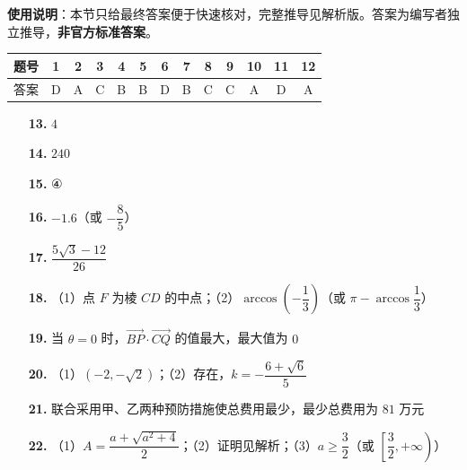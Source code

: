 
\begin{gknotice}
\textbf{使用说明}：本节只给最终答案便于快速核对，完整推导见解析版。答案为编写者独立推导，\textbf{非官方标准答案}。
\end{gknotice}

\begin{center}\begin{tabular}{ccccccccccccc}
\toprule
题号 & 1 & 2 & 3 & 4 & 5 & 6 & 7 & 8 & 9 & 10 & 11 & 12 \\
\midrule
答案 & D & A & C & B & B & D & B & C & C & A & D & A \\
\bottomrule
\end{tabular}\end{center}

\begin{itemize}[leftmargin=2.6em]
  \item[\textbf{13.}] $4$
  \item[\textbf{14.}] $240$
  \item[\textbf{15.}] ④
  \item[\textbf{16.}] $-1.6$（或 $-\dfrac{8}{5}$）
\end{itemize}

\begin{itemize}[leftmargin=2.6em]
  \item[\textbf{17.}] $\dfrac{5\sqrt{3} - 12}{26}$
  \item[\textbf{18.}] （1）点 $F$ 为棱 $CD$ 的中点；（2）$\arccos\left(-\dfrac{1}{3}\right)$（或 $\pi - \arccos\dfrac{1}{3}$）
  \item[\textbf{19.}] 当 $\theta = 0$ 时，$\vec{BP} \cdot \vec{CQ}$ 的值最大，最大值为 $0$
  \item[\textbf{20.}] （1）$(-2, -\sqrt{2})$；（2）存在，$k = -\dfrac{6 + \sqrt{6}}{5}$
  \item[\textbf{21.}] 联合采用甲、乙两种预防措施使总费用最少，最少总费用为 $81$ 万元
  \item[\textbf{22.}] （1）$A = \dfrac{a + \sqrt{a^2 + 4}}{2}$；（2）证明见解析；（3）$a \geqslant \dfrac{3}{2}$（或 $\left[\dfrac{3}{2}, +\infty\right)$）
\end{itemize}
